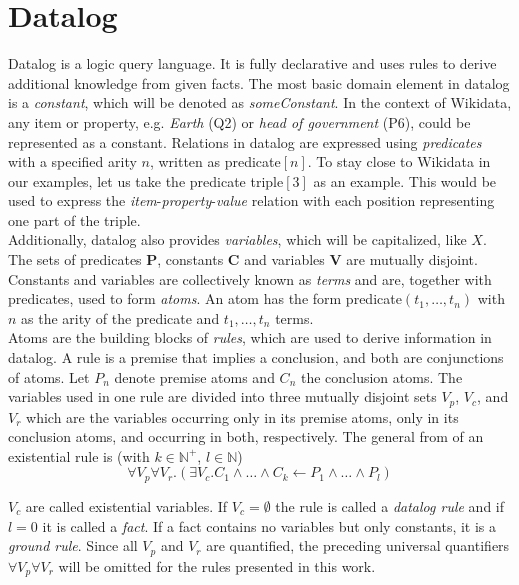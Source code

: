 \documentclass[hyperref,bachelorofscience,fleqn]{cgvpub}
\begin{document}
\section{Datalog}
Datalog is a logic query language. It is fully declarative and uses rules to derive additional knowledge from given facts. The most basic domain element in datalog is a \emph{constant}, which will be denoted as \emph{someConstant}. In the context of Wikidata, any item or property, e.g. \emph{Earth} (Q2) or \emph{head of government} (P6), could be represented as a constant. Relations in datalog are expressed using \emph{predicates} with a specified arity \(n\), written as predicate\([n]\). To stay close to Wikidata in our examples, let us take the predicate triple\([3]\) as an example. This would be used to express the \emph{item}-\emph{property}-\emph{value} relation with each position representing one part of the triple.\\
Additionally, datalog also provides \emph{variables}, which will be capitalized, like \(X\). The sets of predicates {\bf P}, constants {\bf C} and variables {\bf V} are mutually disjoint. Constants and variables are collectively known as \emph{terms} and are, together with predicates, used to form \emph{atoms}. An atom has the form predicate\((t_1, \ldots , t_n)\) with \(n\) as the arity of the predicate and \(t_1,\ldots,t_n\) terms.\\
Atoms are the building blocks of \emph{rules}, which are used to derive information in datalog. A rule is a premise that implies a conclusion, and both are conjunctions of atoms.
Let \(P_n\) denote  premise atoms and \(C_n\) the conclusion atoms. The variables used in one rule are divided into three mutually disjoint sets \(V_p\), \(V_c\), and \(V_r\) which are the variables occurring only in its premise atoms, only in its conclusion atoms, and occurring in both, respectively. The general from of an existential rule is (with \(k \in \mathbb{N}^+\), \(l \in \mathbb{N}\))
\begin{equation}
\forall V_p \forall V_r.(\exists V_c.C_1 \wedge \ldots \wedge C_k \leftarrow P_1 \wedge \ldots \wedge P_l)
\end{equation}

\(V_c\) are called existential variables. If \(V_c = \emptyset\) the rule is called a \emph{datalog rule} and if \(l = 0\) it is called a \emph{fact}. If a fact contains no variables but only constants, it is a \emph{ground rule}. Since all \(V_p\) and \(V_r\) are  quantified, the preceding universal quantifiers \(\forall V_p \forall V_r\) will be omitted for the rules presented in this work.
\end{document}
